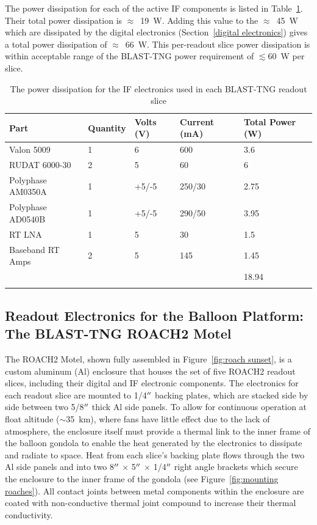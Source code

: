 The power dissipation for each of the active IF components is listed in Table~\ref{tab:if power budget}. Their total power dissipation is $\approx$~19~W. Adding this value to the $\approx$~45~W which are dissipated by the digital electronics (Section~\ref{digital electronics}) gives a total power dissipation of $\approx$~66~W. This per-readout slice power dissipation is within acceptable range of the BLAST-TNG power requirement of $\lesssim$60~W per slice.

\begin{table}[!htbp]
\centering
\begin{tabular}{@{}lllll@{}}
\dtoprule{}
Part & Quantity & Volts (V) & Current (mA) & Total Power (W) \\ \midrule
Valon 5009 & 1 & 6 & 600 & 3.6 \\
RUDAT 6000-30 & 2 & 5 & 60 & 6 \\
Polyphase AM0350A & 1 & +5/-5 & 250/30 & 2.75 \\
Polyphase AD0540B & 1 & +5/-5 & 290/50 & 3.95 \\
RT LNA & 1 & 5 & 30 & 1.5 \\
Baseband RT Amps & 2 & 5 & 145 & 1.45 \\
 &  &  &  & 18.94 \\ \dbottomrule{}
\end{tabular}
\caption[~The power dissipation for the IF electronics used in each BLAST-TNG readout slice]{The power dissipation for the IF electronics used in each BLAST-TNG readout slice}
\label{tab:if power budget}
\end{table}

\subsection{Readout Electronics for the Balloon Platform: The BLAST-TNG ROACH2 Motel}

The ROACH2 Motel, shown fully assembled in Figure~\ref{fig:roach sunset}, is a custom aluminum (Al) enclosure that houses the set of five ROACH2 readout slices, including their digital and IF electronic components. The electronics for each readout slice are mounted to 1/4$\operatorname{^{\prime\prime}}$ backing plates, which are stacked side by side between two 5/8$\operatorname{^{\prime\prime}}$ thick Al side panels. To allow for continuous operation at float altitude ($\sim$35~km), where fans have little effect due to the lack of atmosphere, the enclosure itself must provide a thermal link to the inner frame of the balloon gondola to enable the heat generated by the electronics to dissipate and radiate to space. Heat from each slice's backing plate flows through the two Al side panels and into two 8$\operatorname{^{\prime\prime}}$ $\times$ 5$\operatorname{^{\prime\prime}}$ $\times$ 1/4$\operatorname{^{\prime\prime}}$ right angle brackets which secure the enclosure to the inner frame of the gondola (see Figure~\ref{fig:mounting roaches}). All contact joints between metal components within the enclosure are coated with non-conductive thermal joint compound to increase their thermal conductivity.


